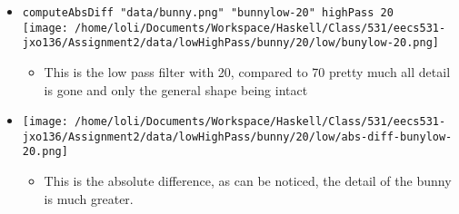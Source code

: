\documentclass{article}
\begin{document}
\begin{enumerate}
\begin{enumerate}
\begin{itemize}
\begin{itemize}
\begin{itemize}
\end{itemize}
\item \texttt{computeAbsDiff "data/bunny.png" "bunnylow-20" highPass 20} \\
    \texttt{[image: /home/loli/Documents/Workspace/Haskell/Class/531/eecs531-jxo136/Assignment2/data/lowHighPass/bunny/20/low/bunylow-20.png]}
\begin{itemize}
\item This is the low pass filter with 20, compared to 70 pretty much
all detail is gone and only the general shape being intact
\end{itemize}
\item \texttt{[image: /home/loli/Documents/Workspace/Haskell/Class/531/eecs531-jxo136/Assignment2/data/lowHighPass/bunny/20/low/abs-diff-bunylow-20.png]}
\begin{itemize}
\item This is the absolute difference, as can be noticed, the detail
of the bunny is much greater.
\end{itemize}
\end{itemize}
\end{itemize}
\end{enumerate}
\end{enumerate}
\end{document}
